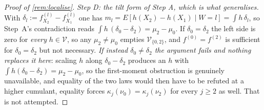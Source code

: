 \begin{proof}[Proof of \cref{rem:localise}]
\emph{Step D: the tilt form of Step A, which is what generalises.} With
$\delta_l:=f^{(l)}_{X_2}-f^{(l)}_{X_1}$ one has
$m_l=E[h(X_2)-h(X_1)\mid W=l]=\int h\,\delta_l$, so Step~A's contradiction reads
$\int h\,(\delta_0-\delta_2)=\mu_2-\mu_0$. If $\delta_0=\delta_2$ the left side is zero for
\emph{every} $h\in\mathcal V$, so any $\mu_2\neq\mu_0$ empties $\mathcal V_{\{0,2\}}$, and
$f^{(0)}=f^{(2)}$ is sufficient for $\delta_0=\delta_2$ but not necessary. \emph{If instead
$\delta_0\neq\delta_2$ the argument fails and nothing replaces it here}: scaling $h$ along
$\delta_0-\delta_2$ produces an $h$ with $\int h(\delta_0-\delta_2)=\mu_2-\mu_0$, so the first-moment
obstruction is genuinely unavailable, and equality of the two laws would then have to be refuted at a
higher cumulant, equality forces $\kappa_j(\nu_0)=\kappa_j(\nu_2)$ for every $j\ge2$ as well. That
is not attempted.
\end{proof}

%
%

